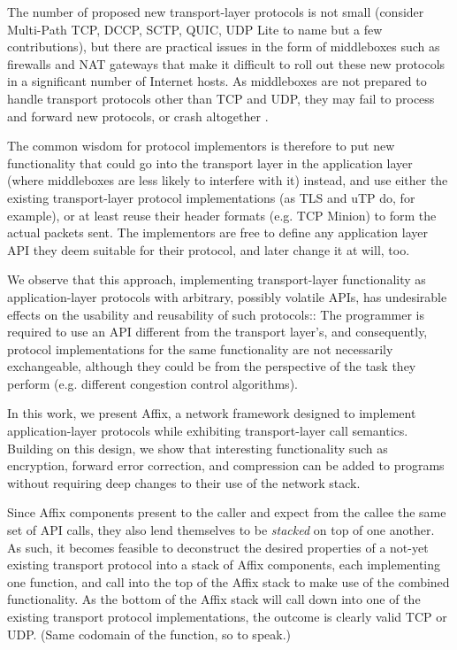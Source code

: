 The number of proposed new transport-layer protocols is not small
(consider Multi-Path TCP, DCCP, SCTP, QUIC, UDP Lite to name but a
few contributions), but there are practical issues in the form of
middleboxes such as firewalls and \ac{NAT} gateways that make it
difficult to roll out these new protocols in a significant number
of Internet hosts. As middleboxes are not prepared to handle transport
protocols other than TCP and UDP, they may fail to process and
forward new protocols, or crash altogether \cite{ECN-survey}.

The common wisdom for protocol implementors is therefore to put new
functionality that could go into the transport layer in the application
layer (where middleboxes are less likely to interfere with it)
instead, and use either the existing transport-layer protocol
implementations (as TLS and uTP do, for example), or at least reuse
their header formats (e.g. TCP Minion) to form the actual packets
sent. The implementors are free to define any application layer
\ac{API} they deem suitable for their protocol, and later change
it at will, too.

We observe that this approach, implementing transport-layer
functionality as application-layer protocols with arbitrary, possibly
volatile \acp{API}, has undesirable effects on the usability and
reusability of such protocols:: The programmer is required to use
an \ac{API} different from the transport layer's, and consequently,
protocol implementations for the same functionality are not necessarily
exchangeable, although they could be from the perspective of the
task they perform (e.g. different congestion control algorithms).

In this work, we present Affix, a network framework designed to
implement application-layer protocols while exhibiting transport-layer
call semantics. Building on this design, we show that interesting
functionality such as encryption, forward error correction, and
compression can be added to programs without requiring deep changes
to their use of the network stack.

Since Affix components present to the caller and expect from the
callee the same set of \ac{API} calls, they also lend themselves
to be \textit{stacked} on top of one another. As such, it becomes
feasible to deconstruct the desired properties of a not-yet existing
transport protocol into a stack of Affix components, each implementing
one function, and call into the top of the Affix stack to make use
of the combined functionality. As the bottom of the Affix stack
will call down into one of the existing transport protocol
implementations, the outcome is clearly valid TCP or UDP. (Same
codomain of the function, so to speak.)

